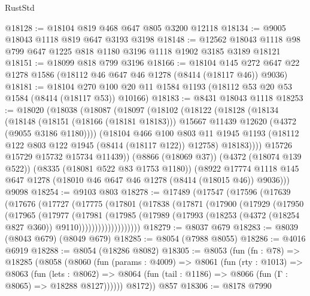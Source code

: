 \begin{lexlean}{RustStd}
\begin{coremodule}
@18128 := @18104 @819 @468 @647 @805 @3200 @12118
@18134 := @9005 @18043 @1118 @819 @647 @3193 @3198
@18148 := @12562 @18043 @1118 @98 @799 @647 @1225 @818 @1180 @3196 @1118 @1902 @3185 @3189 @18121
@18151 := @18099 @818 @799 @3196
@18166 := @18104
    @145
    @272
    @647
    @22
    @1278
    @1586
    (@18112 @46 @647 @46 @1278 (@8414 (@18117 @46)) @9036)
@18181 := @18104
    @270
    @100
    @20
    @11
    @1584
    @1193
    (@18112 @53 @20 @53 @1584 (@8414 (@18117 @53)) @10166)
@18183 := @8431 @18043 @1118
@18253 := @18020
    (@18038
      (@18087
        (@18097
          (@18102
            (@18122
              (@18128
                (@18134
                  (@18148
                    (@18151 (@18166 (@18181 @18183)))
                    @15667
                    @11439
                    @12620
                    (@4372 (@9055 @3186 @1180))))
                (@18104
                  @466
                  @100
                  @803
                  @11
                  @1945
                  @1193
                  (@18112 @122 @803 @122 @1945 (@8414 (@18117 @122)) @12758)
                  @18183))))
          @15726
          @15729
          @15732
          @15734
          @11439))
      (@8866 (@18069 @37))
      (@4372 (@18074 @139 @522))
      (@8335 (@18081 @522 @83 @1753 @1180))
      (@8922 @17774 @1118 @145 @647 @1278 (@18010 @46 @647 @46 @1278 (@8414 (@18015 @46)) @9036)))
    @9098
@18254 := @9103 @803
@18278 := @17489
    (@17547
      (@17596
        (@17639
          (@17676
            (@17727
              (@17775
                (@17801
                  (@17838
                    (@17871
                      (@17900
                        (@17929
                          (@17950
                            (@17965
                              (@17977
                                (@17981
                                  (@17985
                                    (@17989
                                      (@17993
                                        (@18253 (@4372 (@18254 @827 @360)) @9110)))))))))))))))))))
@18279 := @8037 @679
@18283 := @8039 (@8043 @679) (@8049 @679)
@18285 := @8054 (@7988 @8055)
@18286 := @4016 @6919
@18288 := @8054 (@18286 @8082)
@18305 := @8053
    (fun (fn : @78) =>
    @18285
      (@8058
        (@8060
          (fun (params : @4009) =>
          @8061
            (fun (rty : @1013) =>
            @8063
              (fun (lets : @8062) =>
              @8064 (fun (tail : @1186) => @8066 (fun (Γ : @8065) => @18288 @8127))))))
        @8172))
    @857
@18306 := @8178 @7990

\end{coremodule}
\end{lexlean}
